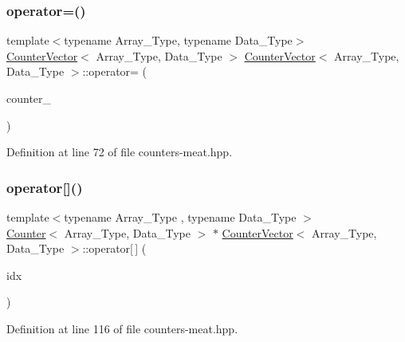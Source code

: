 \mbox{\label{class_counter_vector_a2bfd2bd8e1d5a723cbc3a5538988a944}} 
\subsubsection{\texorpdfstring{operator=()}{operator=()}}
{\footnotesize\ttfamily template$<$typename Array\+\_\+\+Type, typename Data\+\_\+\+Type$>$ \\
\hyperlink{class_counter_vector}{Counter\+Vector}$<$ Array\+\_\+\+Type, Data\+\_\+\+Type $>$ \hyperlink{class_counter_vector}{Counter\+Vector}$<$ Array\+\_\+\+Type, Data\+\_\+\+Type $>$\+::operator= (\begin{DoxyParamCaption}\item[{const \hyperlink{class_counter_vector}{Counter\+Vector}$<$ Array\+\_\+\+Type, Data\+\_\+\+Type $>$ \&}]{counter\+\_\+ }\end{DoxyParamCaption})}



Definition at line 72 of file counters-\/meat.\+hpp.

\mbox{\label{class_counter_vector_a6eac3e73298e1e6d424b92f324ffe9a8}} 
\subsubsection{\texorpdfstring{operator[]()}{operator[]()}}
{\footnotesize\ttfamily template$<$typename Array\+\_\+\+Type , typename Data\+\_\+\+Type $>$ \\
\hyperlink{class_counter}{Counter}$<$ Array\+\_\+\+Type, Data\+\_\+\+Type $>$ $\ast$ \hyperlink{class_counter_vector}{Counter\+Vector}$<$ Array\+\_\+\+Type, Data\+\_\+\+Type $>$\+::operator\mbox{[}$\,$\mbox{]} (\begin{DoxyParamCaption}\item[{\hyperlink{typedefs_8hpp_a91ad9478d81a7aaf2593e8d9c3d06a14}{uint}}]{idx }\end{DoxyParamCaption})\hspace{0.3cm}{\ttfamily [inline]}}



Definition at line 116 of file counters-\/meat.\+hpp.


